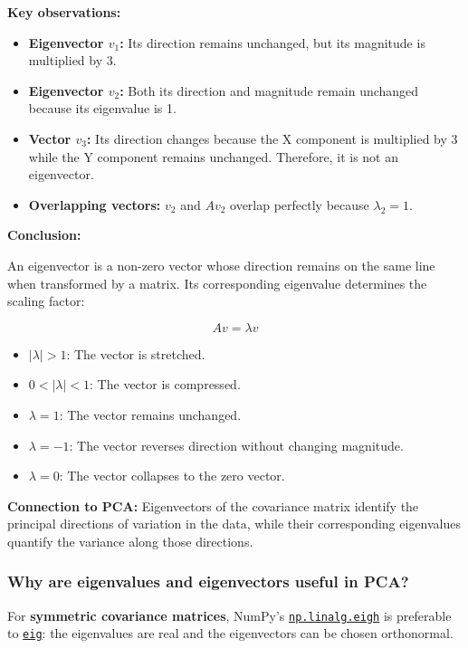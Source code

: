 \documentclass[11pt]{article}
\providecommand{\tightlist}{%
      \setlength{\itemsep}{0pt}\setlength{\parskip}{0pt}}
\begin{document}
\textbf{Key observations:}

\begin{itemize}
\tightlist
\item
  \textbf{Eigenvector \(v_1\):} Its direction remains unchanged, but its
  magnitude is multiplied by 3.
\item
  \textbf{Eigenvector \(v_2\):} Both its direction and magnitude remain
  unchanged because its eigenvalue is 1.
\item
  \textbf{Vector \(v_3\):} Its direction changes because the X component
  is multiplied by 3 while the Y component remains unchanged. Therefore,
  it is not an eigenvector.
\item
  \textbf{Overlapping vectors:} \(v_2\) and \(Av_2\) overlap perfectly
  because \(\lambda_2=1\).
\end{itemize}

\textbf{Conclusion:}

An eigenvector is a non-zero vector whose direction remains on the same
line when transformed by a matrix. Its corresponding eigenvalue
determines the scaling factor:

\[
\boxed{Av=\lambda v}
\]

\begin{itemize}
\tightlist
\item
  \(|\lambda|>1\): The vector is stretched.
\item
  \(0<|\lambda|<1\): The vector is compressed.
\item
  \(\lambda=1\): The vector remains unchanged.
\item
  \(\lambda=-1\): The vector reverses direction without changing
  magnitude.
\item
  \(\lambda=0\): The vector collapses to the zero vector.
\end{itemize}

\textbf{Connection to PCA:} Eigenvectors of the covariance matrix
identify the principal directions of variation in the data, while their
corresponding eigenvalues quantify the variance along those directions.



    \subsubsection{Why are eigenvalues and eigenvectors useful in
PCA?}\label{why-are-eigenvalues-and-eigenvectors-useful-in-pca}

For \textbf{symmetric covariance matrices}, NumPy's
\href{https://numpy.org/doc/stable/reference/generated/numpy.linalg.eigh.html}{\texttt{np.linalg.eigh}}
is preferable to
\href{https://numpy.org/doc/stable/reference/generated/numpy.linalg.eig.html}{\texttt{eig}}:
the eigenvalues are real and the eigenvectors can be chosen orthonormal.
\end{document}
